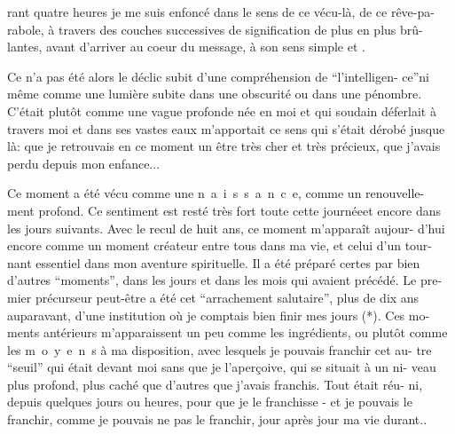 rant quatre heures je me suis enfoncé dans le sens de ce vécu-là, de ce rêve-pa-\linebreak
rabole, à travers des couches successives de signification de plus en plus brû-\linebreak
lantes, avant d'arriver au coeur du message, à son sens simple et .

Ce n'a pas été alors le déclic subit d'une compréhension de ``l'intelligen-\linebreak
ce''\inserted{,}ni même comme une lumière subite dans une obscurité ou dans une pénombre.
C'était plutôt comme une vague profonde née en moi et qui soudain déferlait à
travers moi et dans ses vastes eaux m'apportait ce sens qui s'était dérobé
jusque là: que je retrouvais en ce moment un être très cher et très précieux,
que j'avais perdu depuis mon enfance...

Ce moment a été vécu comme une \mbox{n a i s s a n c e}, comme un renouvelle-\linebreak
ment profond. Ce sentiment est resté très fort toute cette journée\inserted{,}et encore
dans les jours suivants. Avec le recul de huit ans, ce moment m'apparaît aujour-\linebreak
d'hui encore comme un moment créateur entre tous dans ma vie, et celui d'un tour-\linebreak
nant essentiel dans mon aventure spirituelle. Il a été préparé certes par bien
d'autres ``moments'', dans les jours et dans les mois qui avaient précédé. Le pre-\linebreak
mier précurseur peut-être a été cet ``arrachement salutaire'', plus de dix ans
auparavant, d'une institution où je comptais bien finir mes jours (*). Ces mo-\linebreak
ments antérieurs m'apparaissent un peu comme les ingrédients, ou plutôt comme
les \mbox{m o y e n s} à ma disposition, avec lesquels je pouvais franchir cet au-\linebreak
tre ``seuil'' qui était devant moi sans que je l'aperçoive, qui se situait à un ni-\linebreak
veau plus profond, plus caché que d'autres que j'avais franchis. Tout était réu-\linebreak
ni, depuis quelques jours ou heures, pour que je le franchisse - et je pouvais
le franchir, comme je pouvais ne pas le franchir, jour après jour ma vie durant..

